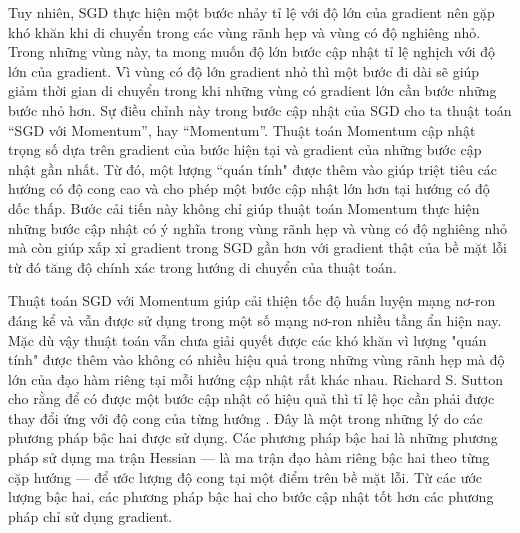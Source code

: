 Tuy nhiên, SGD thực hiện một bước nhảy tỉ lệ với độ lớn của gradient nên gặp khó khăn khi di chuyển trong các vùng rãnh hẹp và vùng có độ nghiêng nhỏ. Trong những vùng này, ta mong muốn độ lớn bước cập nhật tỉ lệ nghịch với độ lớn của gradient. Vì vùng có độ lớn gradient nhỏ thì một bước đi dài sẽ giúp giảm thời gian di chuyển trong khi những vùng có gradient lớn cần bước những bước nhỏ hơn. Sự điều chỉnh này trong bước cập nhật của SGD cho ta thuật toán ``SGD với Momentum'', hay ``Momentum''. Thuật toán Momentum cập nhật trọng số dựa trên gradient của bước hiện tại và gradient của những bước cập nhật gần nhất. Từ đó, một lượng ``quán tính" được thêm vào giúp triệt tiêu các hướng có độ cong cao và cho phép một bước cập nhật lớn hơn tại hướng có độ dốc thấp. Bước cải tiến này không chỉ giúp thuật toán Momentum thực hiện những bước cập nhật có ý nghĩa trong vùng rãnh hẹp và vùng có độ nghiêng nhỏ mà còn giúp xấp xỉ gradient trong SGD gần hơn với gradient thật của bề mặt lỗi từ đó tăng độ chính xác trong hướng di chuyển của thuật toán.

Thuật toán SGD với Momentum giúp cải thiện tốc độ huấn luyện mạng nơ-ron đáng kể và vẫn được sử dụng trong một số mạng nơ-ron nhiều tầng ẩn hiện nay. Mặc dù vậy thuật toán vẫn chưa giải quyết được các khó khăn vì lượng "quán tính" được thêm vào không có nhiều hiệu quả trong những vùng rãnh hẹp mà độ lớn của đạo hàm riêng tại mỗi hướng cập nhật rất khác nhau. Richard S. Sutton cho rằng để có được một bước cập nhật có hiệu quả thì tỉ lệ học cần phải được thay đổi ứng với độ cong của từng hướng \cite{sutton1986two}. Đây là một trong những lý do các phương pháp bậc hai được sử dụng. Các phương pháp bậc hai là những phương pháp sử dụng ma trận Hessian — là ma trận đạo hàm riêng bậc hai theo từng cặp hướng — để ước lượng độ cong tại một điểm trên bề mặt lỗi. Từ các ước lượng bậc hai, các phương pháp bậc hai cho bước cập nhật tốt hơn các phương pháp chỉ sử dụng gradient.


